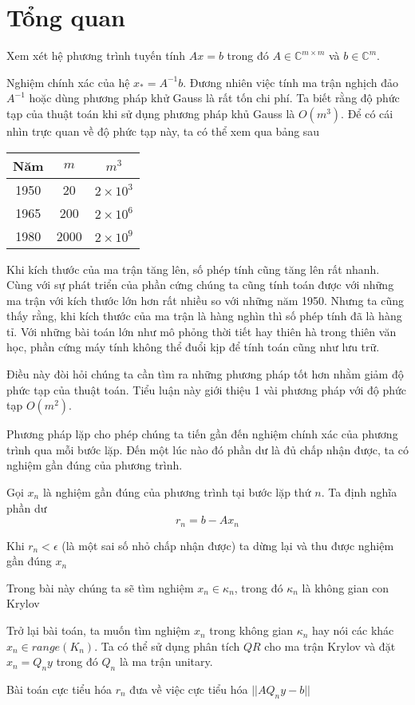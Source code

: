 \chapter{Tổng quan}
Xem xét hệ phương trình tuyến tính $Ax=b$ trong đó $A \in \mathbb{C} ^{m \times m}$ 
và $b \in \mathbb{C}^m$.

Nghiệm chính xác của hệ $x_* = A^{-1}b$. Đương nhiên việc tính ma trận nghịch đảo $A^{-1}$
hoặc dùng phương pháp khử Gauss là rất tốn chi phí. Ta biết rằng độ phức tạp của thuật 
toán khi sử dụng phương pháp khủ Gauss là $O(m^3)$. Để có cái nhìn trực quan về độ phức tạp 
này, ta có thể xem qua bảng sau 

\begin{center}
    \begin{tabular}{| c | c | c |}
        \hline
        Năm & $m$ & $m^3$ \\ 
        \hline
        1950 & 20 & $2 \times 10^3$ \\
        1965 & 200 & $2 \times 10^6$ \\
        1980 & 2000 & $2 \times 10^9$ \\
        \hline
    \end{tabular}
\end{center}

Khi kích thước của ma trận tăng lên, số phép tính cũng tăng lên rất nhanh. Cùng với sự phát triển của 
phần cứng chúng ta cũng tính toán được với những ma trận với kích thước lớn hơn rất nhiều so với những
năm 1950. Nhưng ta cũng thấy rằng, khi kích thước của ma trận là hàng nghìn thì số phép tính đã là 
hàng tỉ. Với những bài toán lớn như mô phỏng thời tiết hay thiên hà trong thiên văn học, phần cứng 
máy tính không thể đuổi kịp để tính toán cũng như lưu trữ.

Điều này đòi hỏi chúng ta cần tìm ra những phương pháp tốt hơn nhằm giảm độ phức tạp của thuật toán.
Tiểu luận này giới thiệu 1 vài phương pháp với độ phức tạp $O(m^2)$.

Phương pháp lặp cho phép chúng ta tiến gần đến nghiệm chính xác của phương trình qua mỗi bước lặp.
Đến một lúc nào đó phần dư là đủ chấp nhận được, ta có nghiệm gần đúng của phương trình.

Gọi $x_n$ là nghiệm gần đúng của phương trình tại bước lặp thứ $n$. Ta định nghĩa phần dư
\begin{equation}
    r_n = b - Ax_n
\end{equation}

Khi $r_n < \epsilon$ (là một sai số nhỏ chấp nhận được) ta dừng lại và thu được nghiệm gần đúng $x_n$

Trong bài này chúng ta sẽ tìm nghiệm $x_n \in \kappa_n$, trong đó $\kappa_n$ là không gian con Krylov



Trở lại bài toán, ta muốn tìm nghiệm $x_n$ trong không gian $\kappa_n$ hay nói 
các khác $x_n \in range(K_n)$. Ta có thể sử dụng phân tích $QR$ cho ma trận Krylov và
đặt $x_n = Q_ny$ trong đó $Q_n$ là ma trận unitary. 

Bài toán cực tiểu hóa $r_n$ đưa về việc cực tiểu hóa $||AQ_ny - b||$


